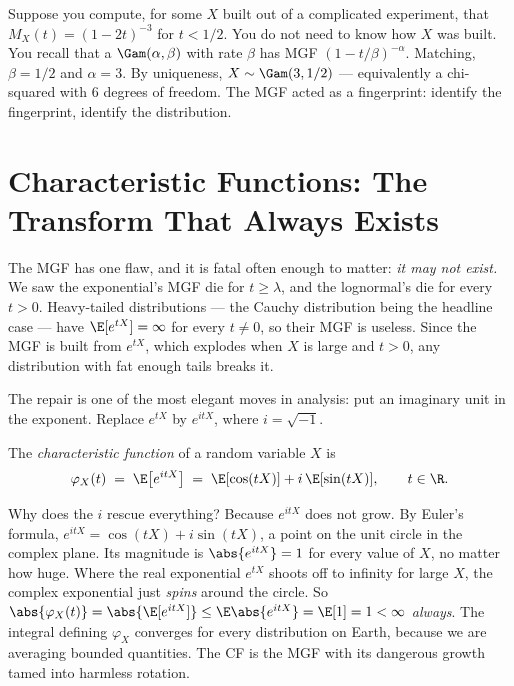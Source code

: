 \begin{example}
Suppose you compute, for some $X$ built out of a complicated experiment, that
$M_X(t)=(1-2t)^{-3}$ for $t<1/2$. You do not need to know how $X$ was built. You
recall that a $\Gam(\alpha,\beta)$ with rate $\beta$ has MGF
$(1-t/\beta)^{-\alpha}$. Matching, $\beta=1/2$ and $\alpha=3$. By uniqueness, $X
\sim \Gam(3, 1/2)$ --- equivalently a chi-squared with $6$ degrees of freedom.
The MGF acted as a fingerprint: identify the fingerprint, identify the
distribution.
\end{example}

\section{Characteristic Functions: The Transform That Always Exists}
\label{ch18:cf}

The MGF has one flaw, and it is fatal often enough to matter:
\emph{it may not exist.} We saw the exponential's MGF die for $t\ge\lambda$, and
the lognormal's die for every $t>0$. Heavy-tailed distributions --- the Cauchy
distribution being the headline case --- have $\E[e^{tX}]=\infty$ for every
$t\ne 0$, so their MGF is useless. Since the MGF is built from $e^{tX}$, which
explodes when $X$ is large and $t>0$, any distribution with fat enough tails
breaks it.

The repair is one of the most elegant moves in analysis: put an imaginary unit
in the exponent. Replace $e^{tX}$ by $e^{itX}$, where $i=\sqrt{-1}$.

\begin{definition}
\label{ch18:def-cf}
The \emph{characteristic function} of a random variable $X$ is
\[
  \varphi_X(t) \;=\; \E\!\left[e^{itX}\right]
              \;=\; \E[\cos(tX)] + i\,\E[\sin(tX)],
  \qquad t\in\R .
\]
\end{definition}

\begin{happeningbox}
Why does the $i$ rescue everything? Because $e^{itX}$ does not grow. By Euler's
formula, $e^{itX}=\cos(tX)+i\sin(tX)$, a point on the unit circle in the complex
plane. Its magnitude is $\abs{e^{itX}}=1$ for every value of $X$, no matter how
huge. Where the real exponential $e^{tX}$ shoots off to infinity for large $X$,
the complex exponential just \emph{spins} around the circle. So
$\abs{\varphi_X(t)}=\abs{\E[e^{itX}]}\le \E\abs{e^{itX}} = \E[1] = 1 < \infty$
\emph{always}. The integral defining $\varphi_X$ converges for every
distribution on Earth, because we are averaging bounded quantities. The CF is
the MGF with its dangerous growth tamed into harmless rotation.
\end{happeningbox}

